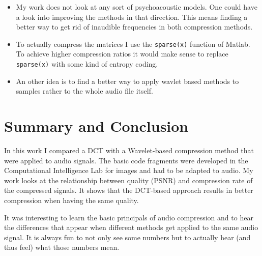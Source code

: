 \documentclass[a4paper]{scrartcl}
\begin{document}
\begin{itemize}

\item My work does not look at any sort of psychoacoustic models. One could have
a look into improving the methods in that direction. This means finding a better
way to get rid of inaudible frequencies in both compression methods.

\item To actually compress the matrices I use the \texttt{sparse(x)} function of
Matlab. To achieve higher compression ratios it would make sense to replace
\texttt{sparse(x)} with some kind of entropy coding.

\item An other idea is to find a better way to apply wavlet based methods to
samples rather to the whole audio file itself.

\end{itemize}
\section{Summary and Conclusion}

In this work I compared a DCT with a Wavelet-based compression method that were
applied to audio signals. The basic code fragments were developed in the
Computational Intelligence Lab for images and had to be adapted to audio. My
work looks at the relationship between quality (PSNR) and compression rate of
the compressed signals. It shows that the DCT-based approach results in better
compression when having the same quality.

It was interesting to learn the basic principals of audio compression and to
hear the differences that appear when different methods get applied to the same
audio signal. It is always fun to not only see some numbers but to
actually hear (and thus feel) what those numbers mean.
\end{document}
